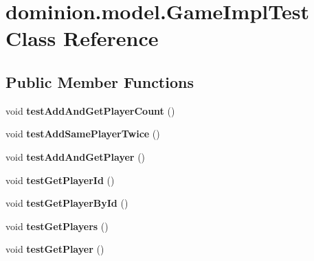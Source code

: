 \hypertarget{classdominion_1_1model_1_1GameImplTest}{\section{dominion.\-model.\-Game\-Impl\-Test \-Class \-Reference}
\label{classdominion_1_1model_1_1GameImplTest}
}
\subsection*{\-Public \-Member \-Functions}
\begin{DoxyCompactItemize}
\item 
\hypertarget{classdominion_1_1model_1_1GameImplTest_ad0bbdae4ebbcc66acf548f9fa6af520b}{void {\bfseries test\-Add\-And\-Get\-Player\-Count} ()}\label{classdominion_1_1model_1_1GameImplTest_ad0bbdae4ebbcc66acf548f9fa6af520b}

\item 
\hypertarget{classdominion_1_1model_1_1GameImplTest_a028370e3dff32030b02d9f0897dec0ca}{void {\bfseries test\-Add\-Same\-Player\-Twice} ()}\label{classdominion_1_1model_1_1GameImplTest_a028370e3dff32030b02d9f0897dec0ca}

\item 
\hypertarget{classdominion_1_1model_1_1GameImplTest_ab112ced045b9fa4acd310bd6294a0f21}{void {\bfseries test\-Add\-And\-Get\-Player} ()}\label{classdominion_1_1model_1_1GameImplTest_ab112ced045b9fa4acd310bd6294a0f21}

\item 
\hypertarget{classdominion_1_1model_1_1GameImplTest_a4d41837d78311c144d743d8874bbd752}{void {\bfseries test\-Get\-Player\-Id} ()}\label{classdominion_1_1model_1_1GameImplTest_a4d41837d78311c144d743d8874bbd752}

\item 
\hypertarget{classdominion_1_1model_1_1GameImplTest_a36c718fe133af74b17142daba7d6bda0}{void {\bfseries test\-Get\-Player\-By\-Id} ()}\label{classdominion_1_1model_1_1GameImplTest_a36c718fe133af74b17142daba7d6bda0}

\item 
\hypertarget{classdominion_1_1model_1_1GameImplTest_acf1531e8b8bb0564cfd00afe4e03c0b6}{void {\bfseries test\-Get\-Players} ()}\label{classdominion_1_1model_1_1GameImplTest_acf1531e8b8bb0564cfd00afe4e03c0b6}

\item 
\hypertarget{classdominion_1_1model_1_1GameImplTest_a038149090385771f8dc9def487bdb916}{void {\bfseries test\-Get\-Player} ()}\label{classdominion_1_1model_1_1GameImplTest_a038149090385771f8dc9def487bdb916}


\end{DoxyCompactItemize}

